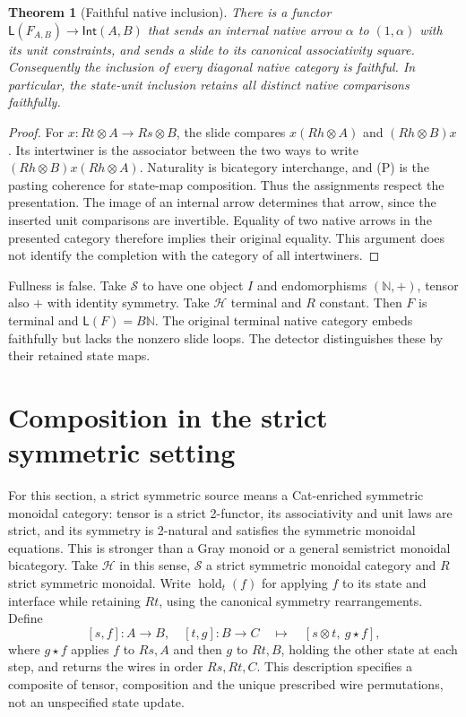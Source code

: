 \documentclass[11pt]{article}
\newtheorem{theorem}{Theorem}\newtheorem{proposition}{Proposition}
\begin{document}
\begin{theorem}[Faithful native inclusion]
There is a functor $\mathsf L(F_{A,B})\to\mathsf{Int}(A,B)$ that sends an internal native arrow $\alpha$ to $(1,\alpha)$ with its unit constraints, and sends a slide to its canonical associativity square. Consequently the inclusion of every diagonal native category is faithful. In particular, the state-unit inclusion retains all distinct native comparisons faithfully.
\end{theorem}
\begin{proof}
For $x:Rt\otimes A\to Rs\otimes B$, the slide compares $x(Rh\otimes A)$ and $(Rh\otimes B)x$. Its intertwiner is the associator between the two ways to write $(Rh\otimes B)x(Rh\otimes A)$. Naturality is bicategory interchange, and (P) is the pasting coherence for state-map composition. Thus the assignments respect the presentation. The image of an internal arrow determines that arrow, since the inserted unit comparisons are invertible. Equality of two native arrows in the presented category therefore implies their original equality. This argument does not identify the completion with the category of all intertwiners.
\end{proof}
Fullness is false. Take $\mathcal S$ to have one object $I$ and endomorphisms $(\mathbb N,+)$, tensor also $+$ with identity symmetry. Take $\mathcal H$ terminal and $R$ constant. Then $F$ is terminal and $\mathsf L(F)=B\mathbb N$. The original terminal native category embeds faithfully but lacks the nonzero slide loops. The detector distinguishes these by their retained state maps.

\section{Composition in the strict symmetric setting}
For this section, a strict symmetric source means a Cat-enriched symmetric monoidal category: tensor is a strict 2-functor, its associativity and unit laws are strict, and its symmetry is 2-natural and satisfies the symmetric monoidal equations. This is stronger than a Gray monoid or a general semistrict monoidal bicategory. Take $\mathcal H$ in this sense, $\mathcal S$ a strict symmetric monoidal category and $R$ strict symmetric monoidal. Write $\operatorname{hold}_t(f)$ for applying $f$ to its state and interface while retaining $Rt$, using the canonical symmetry rearrangements. Define
\[
 [s,f]:A\to B,\quad[t,g]:B\to C
 \quad\mapsto\quad
 [s\otimes t,\ g\star f],
\]
where $g\star f$ applies $f$ to $Rs,A$ and then $g$ to $Rt,B$, holding the other state at each step, and returns the wires in order $Rs,Rt,C$. This description specifies a composite of tensor, composition and the unique prescribed wire permutations, not an unspecified state update.
\end{document}
